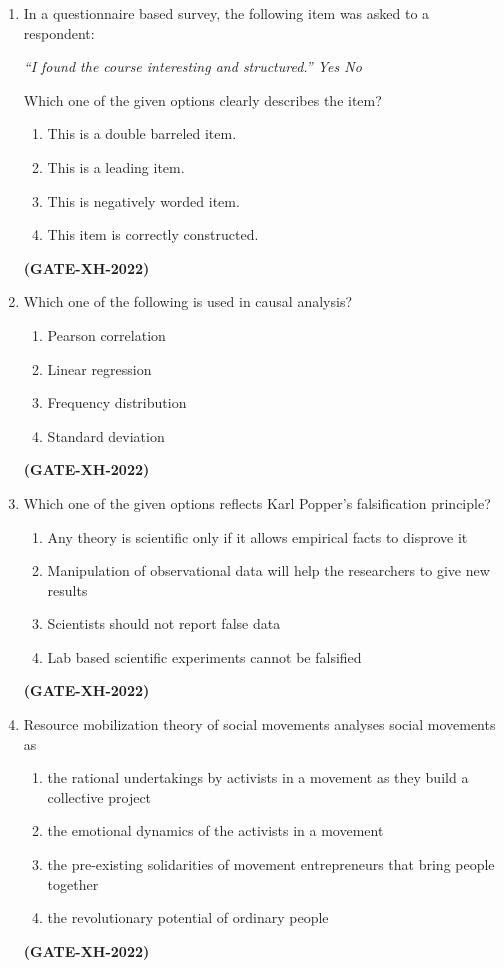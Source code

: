 \documentclass[journal]{IEEEtran}
\begin{document}
\begin{enumerate}
\item
In a questionnaire based survey, the following item was asked to a respondent:

\textit{“I found the course interesting and structured.” \underline{\hspace{0.3cm}}Yes \hspace{0.5cm} \underline{\hspace{0.3cm}}No}

Which one of the given options clearly describes the item?
\begin{multicols}{2}
\begin{enumerate}
\item This is a double barreled item.
\item This is a leading item.
\item This is negatively worded item.
\item This item is correctly constructed.
\end{enumerate}
\end{multicols}
\hfill\textbf{(GATE-XH-2022)}

\item
Which one of the following is used in causal analysis?
\begin{multicols}{2}
\begin{enumerate}
\item Pearson correlation
\item Linear regression
\item Frequency distribution
\item Standard deviation
\end{enumerate}
\end{multicols}
\hfill\textbf{(GATE-XH-2022)}

\item
Which one of the given options reflects Karl Popper’s falsification principle?
\begin{enumerate}
\item Any theory is scientific only if it allows empirical facts to disprove it
\item Manipulation of observational data will help the researchers to give new results
\item Scientists should not report false data
\item Lab based scientific experiments cannot be falsified
\end{enumerate}
\hfill\textbf{(GATE-XH-2022)}

\item
Resource mobilization theory of social movements analyses social movements as
\begin{enumerate}
\item the rational undertakings by activists in a movement as they build a collective project
\item the emotional dynamics of the activists in a movement
\item the pre-existing solidarities of movement entrepreneurs that bring people together
\item the revolutionary potential of ordinary people
\end{enumerate}
\hfill\textbf{(GATE-XH-2022)}


\end{enumerate}
\end{document}
